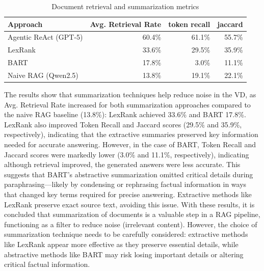 \begin{table}[t]
\centering
\caption{Document retrieval and summarization metrics}
\label{tab:document_retrieved_metrics_summarization}
\begin{tabular}{lrrr}
\hline
Approach & Avg. Retrieval Rate & token recall & jaccard \\
\hline
Agentic ReAct (\gls{GPT}-5)& 60.4\% & 61.1\%  & 55.7\%\\
LexRank & 33.6\% & 29.5\%  & 35.9\% \\
BART & 17.8\% & 3.0\% & 11.1\% \\
Naive \gls{RAG} (Qwen2.5) & 13.8\% & 19.1\% & 22.1\% \\
\hline
\end{tabular}
\end{table}

The results show that summarization techniques help reduce noise in the \gls{VD}, as Avg. Retrieval Rate increased for both summarization approaches compared to the naive RAG baseline (13.8\%): LexRank achieved 33.6\% and BART 17.8\%.
LexRank also improved Token Recall and Jaccard scores (29.5\% and 35.9\%, respectively), indicating that the extractive summaries preserved key information needed for accurate answering.
However, in the case of BART, Token Recall and Jaccard scores were markedly lower (3.0\% and 11.1\%, respectively), indicating although retrieval improved, the generated answers were less accurate. This suggests that BART's abstractive summarization omitted critical details during paraphrasing—likely by condensing or rephrasing factual information in ways that changed key terms required for precise answering. Extractive methods like LexRank preserve exact source text, avoiding this issue.
With these results, it is concluded that summarization of documents is a valuable step in a \gls{RAG} pipeline, functioning as a filter to reduce noise (irrelevant content).
However, the choice of summarization technique needs to be carefully considered: extractive methods like LexRank appear more effective as they preserve essential details, while abstractive methods like BART may risk losing important details or altering critical factual information.

 

